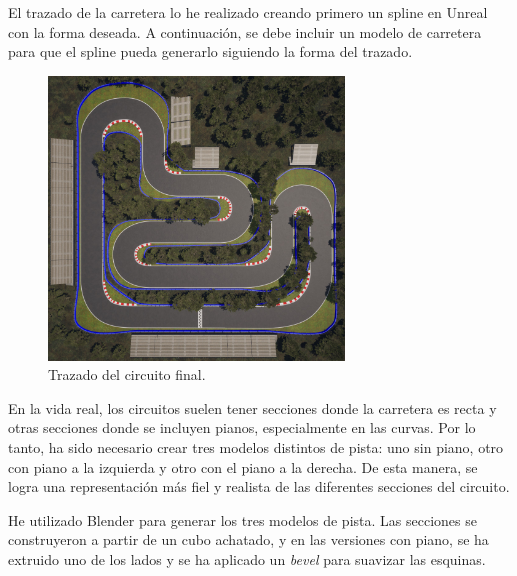 El trazado de la carretera lo he realizado creando primero un spline en Unreal con la forma deseada. A continuación, se debe incluir un modelo de carretera para que el spline pueda generarlo siguiendo la forma del trazado.
\begin{figure}[H]
    \centering
    \includegraphics[width=0.7\textwidth]{imagenes/converted/trazadoFinal.jpg}
    \caption{Trazado del circuito final.}
    \label{fig:trazado}
\end{figure}


En la vida real, los circuitos suelen tener secciones donde la carretera es recta y otras secciones donde se incluyen pianos, especialmente en las curvas. Por lo tanto, ha sido necesario crear tres modelos distintos de pista: uno sin piano, otro con piano a la izquierda y otro con el piano a la derecha. De esta manera, se logra una representación más fiel y realista de las diferentes secciones del circuito.

\bigskip

He utilizado Blender para generar los tres modelos de pista. Las secciones se construyeron a partir de un cubo achatado, y en las versiones con piano, se ha extruido uno de los lados y se ha aplicado un \textit{bevel} para suavizar las esquinas.

